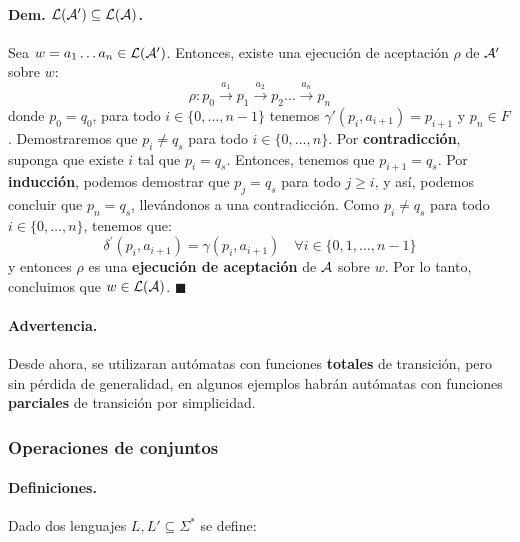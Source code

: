 \paragraph{Dem. $\mathcal{L}(\mathcal{A}') \subseteq \mathcal{L}(\mathcal{A})$.} Sea $w = a_1\ldots a_n \in \mathcal{L}(\mathcal{A}')$. Entonces, existe una ejecución de aceptación $\rho$ de $\mathcal{A}'$ sobre $w$:
$$
    \rho: p_0 \stackrel{a_1}{\rightarrow} p_1 \stackrel{a_2}{\rightarrow} p_2 \ldots \overset{a_n}{\rightarrow} p_n
$$
donde $p_0 = q_0$, para todo $i \in \{0,\ldots,n-1\}$ tenemos $\gamma'(p_i,a_{i+1}) = p_{i+1}$ y $p_n \in F$. Demostraremos que $p_i \neq q_s$ para todo $i \in \{0,\ldots, n\}$. Por \textbf{contradicción}, suponga que existe $i$ tal que $p_i = q_s$. Entonces, tenemos que $p_{i+1} = q_s$. Por \textbf{inducción}, podemos demostrar que $p_j = q_s$ para todo $j \ge i$, y así, podemos concluir que $p_n = q_s$, llevándonos a una contradicción. Como $p_i \neq q_s$ para todo $i \in \{0, \ldots, n\}$, tenemos que:
$$
    \delta^{\prime}\left(p_i, a_{i+1}\right)=\gamma\left(p_i, a_{i+1}\right) \quad \forall i \in\{0,1, \ldots, n-1\}
$$
y entonces $\rho$ es una \textbf{ejecución de aceptación} de $\mathcal{A}$ sobre $w$. Por lo tanto, concluimos que $w \in \mathcal{L}(\mathcal{A})$. \hfill $\blacksquare$

\paragraph{Advertencia.} Desde ahora, se utilizaran autómatas con funciones \textbf{totales} de transición, pero sin pérdida de generalidad, en algunos ejemplos habrán autómatas con funciones \textbf{parciales} de transición por simplicidad.

\subsubsection{Operaciones de conjuntos}
\paragraph{Definiciones.} Dado dos lenguajes $L,L' \subseteq \Sigma^*$ se define:

